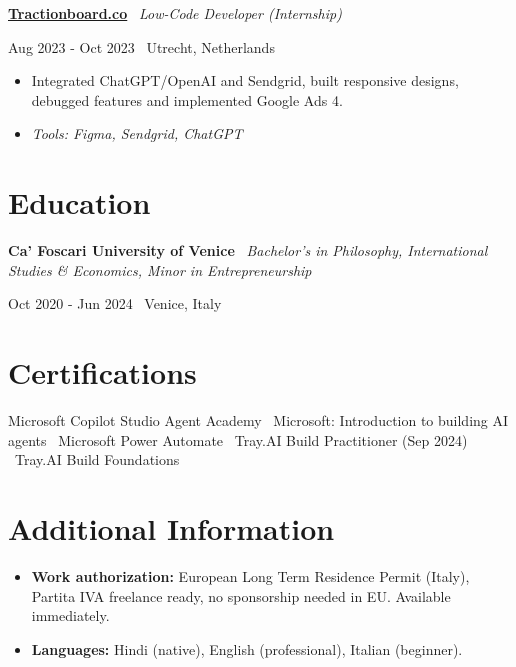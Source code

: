 \documentclass[a4paper,10pt]{article}
\newcommand{\role}[4]{%
 \vspace{2pt}\noindent
 \begin{minipage}[t]{0.70\textwidth}\raggedright\textbf{#1} \textbullet\ \textit{#3}\end{minipage}%
 \hfill
 \begin{minipage}[t]{0.28\textwidth}\raggedleft\footnotesize\color{gray}#2 \textbullet\ #4\end{minipage}%
 \vspace{1pt}%
}
\begin{document}
\role{\href{https://tractionboard.co}{Tractionboard.co}}{Aug 2023 - Oct 2023}{Low-Code Developer (Internship)}{Utrecht, Netherlands}
\begin{itemize}
 \item Integrated ChatGPT/OpenAI and Sendgrid, built responsive designs, debugged features and implemented Google Ads 4.
 \item \textit{Tools: Figma, Sendgrid, ChatGPT}
\end{itemize}

\section{Education}
\role{Ca' Foscari University of Venice}{Oct 2020 - Jun 2024}{Bachelor's in Philosophy, International Studies \& Economics, Minor in Entrepreneurship}{Venice, Italy}

\section{Certifications}
Microsoft Copilot Studio Agent Academy \textbullet\ Microsoft: Introduction to building AI agents \textbullet\ Microsoft Power Automate \textbullet\ Tray.AI Build Practitioner (Sep 2024) \textbullet\ Tray.AI Build Foundations

\section{Additional Information}
\begin{itemize}
 \item \textbf{Work authorization:} European Long Term Residence Permit (Italy), Partita IVA freelance ready, no sponsorship needed in EU. Available immediately.
 \item \textbf{Languages:} Hindi (native), English (professional), Italian (beginner).
\end{itemize}

\end{document}
